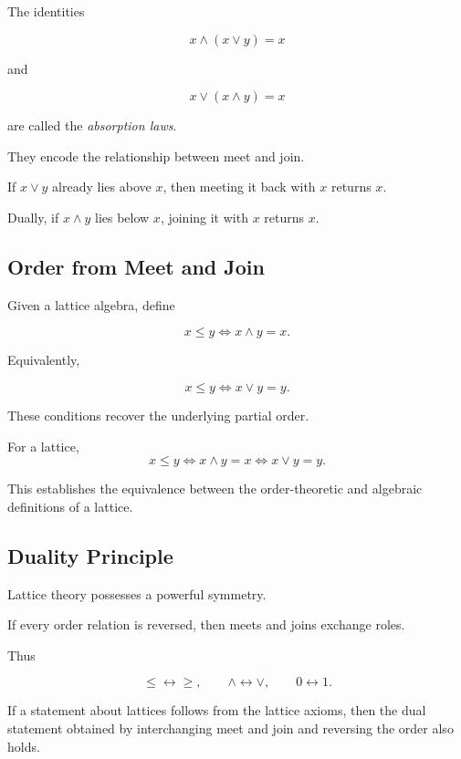 The identities

\[ x\wedge(x\vee y)=x \]

and

\[ x\vee(x\wedge y)=x \]

are called the \emph{absorption laws}.

They encode the relationship between meet and join.

If \(x\vee y\) already lies above \(x\), then meeting it back with \(x\)
returns \(x\).

Dually, if \(x\wedge y\) lies below \(x\), joining it with \(x\) returns
\(x\).

\subsection{Order from Meet and Join}
\label{subsec:order-from-meet-join}

Given a lattice algebra, define

\[ x\leq y\iff x\wedge y=x. \]

Equivalently,

\[ x\leq y\iff x\vee y=y. \]

These conditions recover the underlying partial order.

\begin{theorem}
For a lattice,
\[ x\leq y
\iff x\wedge y=x
\iff x\vee y=y. \]
\end{theorem}

This establishes the equivalence between the order-theoretic and algebraic
definitions of a lattice.

\subsection{Duality Principle}
\label{subsec:lattice-duality}

Lattice theory possesses a powerful symmetry.

If every order relation is reversed, then meets and joins exchange roles.

Thus

\[ \leq\longleftrightarrow\geq, \qquad
\wedge\longleftrightarrow\vee, \qquad
0\longleftrightarrow1. \]

\begin{principle}
If a statement about lattices follows from the lattice axioms, then the
dual statement obtained by interchanging meet and join and reversing the
order also holds.
\end{principle}

